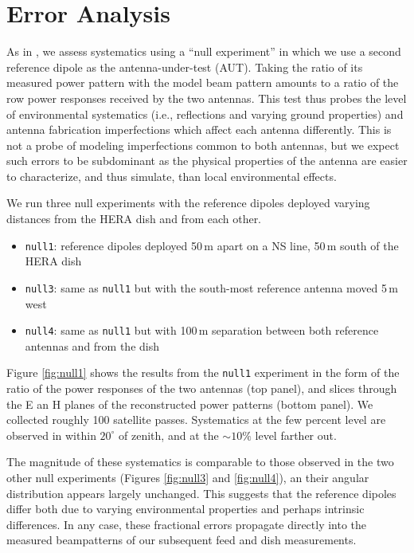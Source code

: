 \documentclass{emulateapj}
\begin{document}
\section{Error Analysis}

As in \citet{neben15}, we assess systematics using a ``null experiment'' in which we use a second reference dipole as the antenna-under-test (AUT). Taking the ratio of its measured power pattern with the model beam pattern amounts to a ratio of the row power responses received by the two antennas. This test thus probes the level of environmental systematics (i.e., reflections and varying ground properties) and antenna fabrication imperfections which affect each antenna differently. This is not a probe of modeling imperfections common to both antennas, but we expect such errors to be subdominant as the physical properties of the antenna are easier to characterize, and thus simulate, than local environmental effects. 

We run three null experiments with the reference dipoles deployed varying distances from the HERA dish and from each other.

\begin{itemize}
\item \texttt{null1}: reference dipoles deployed 50\,m apart on a NS line, 50\,m south of the HERA dish
\item \texttt{null3}: same as \texttt{null1} but with the south-most reference antenna moved 5\,m west
\item \texttt{null4}: same as \texttt{null1} but with 100\,m separation between both reference antennas and from the dish
\end{itemize}

Figure \ref{fig:null1} shows the results from the \texttt{null1} experiment in the form of the ratio of the power responses of the two antennas (top panel), and slices through the E an H planes of the reconstructed power patterns (bottom panel). We collected roughly 100 satellite passes. Systematics at the few percent level are observed in  within $20^\circ$ of zenith, and at the $\sim10\%$ level farther out.

The magnitude of these systematics is comparable to those observed in the two other null experiments (Figures \ref{fig:null3} and \ref{fig:null4}), an their angular distribution appears largely unchanged. This suggests that the reference dipoles differ both due to varying environmental properties and perhaps intrinsic differences. In any case, these fractional errors propagate directly into the measured beampatterns of our subsequent feed and dish measurements.  
\end{document}
